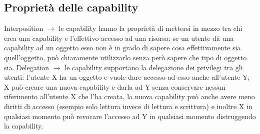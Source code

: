 \subsection{Proprietà delle capability}
Interposition $\rightarrow$ le capability hanno la proprietà di mettersi in mezzo tra chi crea una capability e l'effettivo accesso ad una risorsa: se un utente dà una capability ad un oggetto esso non è in grado di sapere cosa effettivamente sia quell'oggetto, può chiaramente utilizzarlo senza però sapere che tipo di oggetto sia.
Delegation $\rightarrow$ le capability supportano la delegazione dei privilegi tra gli utenti: l'utente X ha un oggetto e vuole dare accesso ad esso anche all'utente Y; X può creare una nuova capability e darla ad Y senza conservare nessun riferimento all'utente X che l'ha creata, la nuova capability può anche avere meno diritti di accesso (esempio solo lettura invece di lettura e scrittura) e inoltre X in qualsiasi momento può revocare l'accesso ad Y in qualsiasi momento distruggendo la capability.
